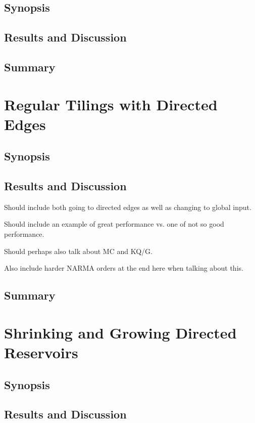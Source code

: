 \subsection{Synopsis}

\subsection{Results and Discussion}

\subsection{Summary}

\section{Regular Tilings with Directed Edges}

\subsection{Synopsis}

\subsection{Results and Discussion}

Should include both going to directed edges as well as changing to global input.

Should include an example of great performance vs. one of not so good
performance.

Should perhaps also talk about MC and KQ/G.

Also include harder NARMA orders at the end here when talking about this.

\subsection{Summary}

\section{Shrinking and Growing Directed Reservoirs}

\subsection{Synopsis}

\subsection{Results and Discussion}

